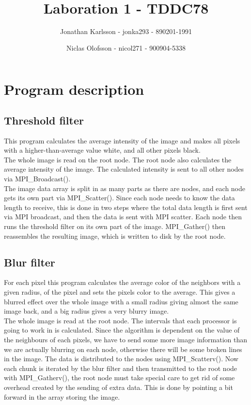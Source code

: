 \documentclass[a4paper]{article}
\author{Jonathan Karlsson - jonka293 - 890201-1991 \and Niclas Olofsson - nicol271 - 900904-5338}
\title{Laboration 1 - TDDC78}
\begin{document}
\maketitle

\section{Program description}
\subsection{Threshold filter}

This program calculates the average intensity of the image and makes all
pixels with a higher-than-average value white, and all other pixels
black.\\

The whole image is read on the root node. The root node also calculates
the  average intensity of the image. The calculated intensity is sent to
all other nodes via MPI\_Broadcast().\\

The image data array is split in as many parts as there are nodes, and
each node gets its own part via MPI\_Scatter(). Since each node needs to
know the data length to receive, this is done in two steps where the
total data length is first sent via MPI broadcast, and then the data is
sent with MPI scatter. Each node then runs the threshold filter on its
own part of the image. MPI\_Gather() then reassembles the resulting image,
which is written to disk by the root node.\\

\subsection{Blur filter}

For each pixel this program calculates the average color of the
neighbors with a given radius, of the pixel and sets the pixels color to
the average. This gives a blurred effect over the whole image with a
small radius giving almost the same image back, and a big radius gives a
very blurry image.\\

The whole image is read at the root node. The intervals that each
processor is going to work in is calculated. Since the algorithm is
dependent on the value of the neighbours of each pixels, we have to send
some more image information than we are actually blurring on each node,
otherwise there will be some broken lines in the image. The data is
distributed to the nodes using MPI\_Scatterv(). Now each chunk is
iterated by the blur filter and then transmitted to the root node with
MPI\_Gatherv(), the root node must take special care to get rid of some
overhead created by the sending of extra data. This is done by pointing
a bit forward in the array storing the image.
\end{document}
